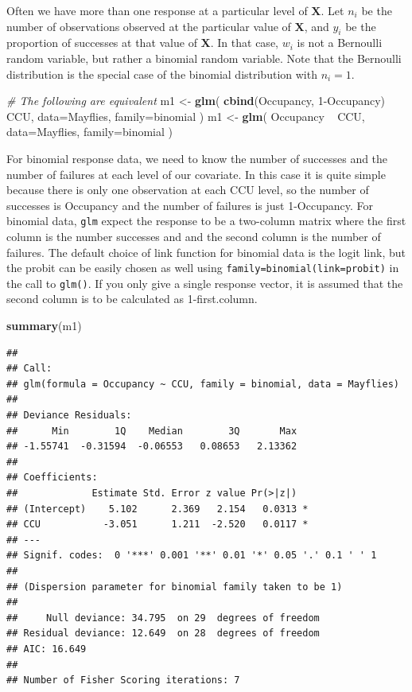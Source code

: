 \documentclass[]{book}
\newenvironment{Shaded}{\begin{snugshade}}{\end{snugshade}}
\newcommand{\KeywordTok}[1]{\textcolor[rgb]{0.13,0.29,0.53}{\textbf{{#1}}}}
\newcommand{\DataTypeTok}[1]{\textcolor[rgb]{0.13,0.29,0.53}{{#1}}}
\newcommand{\DecValTok}[1]{\textcolor[rgb]{0.00,0.00,0.81}{{#1}}}
\newcommand{\StringTok}[1]{\textcolor[rgb]{0.31,0.60,0.02}{{#1}}}
\newcommand{\CommentTok}[1]{\textcolor[rgb]{0.56,0.35,0.01}{\textit{{#1}}}}
\newcommand{\NormalTok}[1]{{#1}}
\theoremstyle{definition}
\theoremstyle{definition}
\theoremstyle{remark}
\begin{document}
Often we have more than one response at a particular level of
\(\boldsymbol{X}\). Let \(n_{i}\) be the number of observations observed
at the particular value of \(\boldsymbol{X}\), and \(y_{i}\) be the
proportion of successes at that value of \(\boldsymbol{X}\). In that
case, \(w_{i}\) is not a Bernoulli random variable, but rather a
binomial random variable. Note that the Bernoulli distribution is the
special case of the binomial distribution with \(n_{i}=1\).

\begin{Shaded}
\begin{Highlighting}[]
\CommentTok{# The following are equivalent}
\NormalTok{m1 <-}\StringTok{ }\KeywordTok{glm}\NormalTok{( }\KeywordTok{cbind}\NormalTok{(Occupancy, }\DecValTok{1}\NormalTok{-Occupancy) ~}\StringTok{ }\NormalTok{CCU, }\DataTypeTok{data=}\NormalTok{Mayflies, }\DataTypeTok{family=}\NormalTok{binomial )}
\NormalTok{m1 <-}\StringTok{ }\KeywordTok{glm}\NormalTok{(                     Occupancy ~}\StringTok{ }\NormalTok{CCU, }\DataTypeTok{data=}\NormalTok{Mayflies, }\DataTypeTok{family=}\NormalTok{binomial )}
\end{Highlighting}
\end{Shaded}

For binomial response data, we need to know the number of successes and
the number of failures at each level of our covariate. In this case it
is quite simple because there is only one observation at each CCU level,
so the number of successes is Occupancy and the number of failures is
just 1-Occupancy. For binomial data, \texttt{glm} expect the response to
be a two-column matrix where the first column is the number successes
and and the second column is the number of failures. The default choice
of link function for binomial data is the logit link, but the probit can
be easily chosen as well using \texttt{family=binomial(link=probit)} in
the call to \texttt{glm()}. If you only give a single response vector,
it is assumed that the second column is to be calculated as
1-first.column.

\begin{Shaded}
\begin{Highlighting}[]
\KeywordTok{summary}\NormalTok{(m1)}
\end{Highlighting}
\end{Shaded}

\begin{verbatim}
## 
## Call:
## glm(formula = Occupancy ~ CCU, family = binomial, data = Mayflies)
## 
## Deviance Residuals: 
##      Min        1Q    Median        3Q       Max  
## -1.55741  -0.31594  -0.06553   0.08653   2.13362  
## 
## Coefficients:
##             Estimate Std. Error z value Pr(>|z|)  
## (Intercept)    5.102      2.369   2.154   0.0313 *
## CCU           -3.051      1.211  -2.520   0.0117 *
## ---
## Signif. codes:  0 '***' 0.001 '**' 0.01 '*' 0.05 '.' 0.1 ' ' 1
## 
## (Dispersion parameter for binomial family taken to be 1)
## 
##     Null deviance: 34.795  on 29  degrees of freedom
## Residual deviance: 12.649  on 28  degrees of freedom
## AIC: 16.649
## 
## Number of Fisher Scoring iterations: 7
\end{verbatim}
\end{document}

